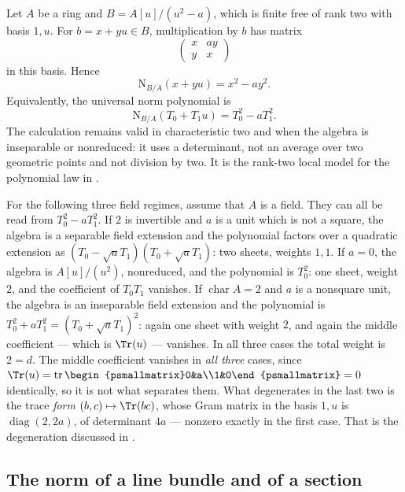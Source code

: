 \begin{example}
\label{ex:ch41-rank-two}
Let $A$ be a ring and
$B=A[u]/(u^2-a)$, which is finite free of rank two with basis $1,u$.
For $b=x+yu\in B$, multiplication by $b$ has matrix
\[
             \begin{pmatrix}x&ay\\ y&x\end{pmatrix}
\]
in this basis.  Hence
\[
             \mathrm N_{B/A}(x+yu)=x^2-ay^2.
\]
Equivalently, the universal norm polynomial is
\[
             \mathrm N_{B/A}(T_0+T_1u)=T_0^2-aT_1^2.
\]
The calculation remains valid in characteristic two and when the algebra
is inseparable or nonreduced: it uses a determinant, not an average over two
geometric points and not division by two.  It is the rank-two local model
for the polynomial law in .

For the following three field regimes, assume that $A$ is a field.
They can all be read from $T_0^2-aT_1^2$.  If $2$ is invertible and $a$ is a unit which is not a
square, the algebra is a separable field extension and the polynomial
factors over a quadratic extension as
$(T_0-\sqrt aT_1)(T_0+\sqrt aT_1)$: two sheets, weights $1,1$.  If
$a=0$, the algebra is $A[u]/(u^2)$, nonreduced, and the polynomial is
$T_0^2$: one sheet, weight $2$, and the coefficient of $T_0T_1$
vanishes.  If $\operatorname{char}A=2$ and $a$ is a nonsquare unit, the
algebra is an inseparable field extension and the polynomial is
$T_0^2+aT_1^2=(T_0+\sqrt aT_1)^2$: again one sheet with weight $2$, and
again the middle coefficient --- which is $\Tr(u)$ --- vanishes.
In all three cases the total weight is $2=d$.  The middle coefficient
vanishes in \emph{all three} cases, since
$\Tr(u)=\operatorname{tr}\begin{psmallmatrix}0&a\\1&0\end{psmallmatrix}=0$
identically, so it is not what separates them.  What degenerates in the last
two is the trace \emph{form} $(b,c)\mapsto\Tr(bc)$, whose Gram matrix in
the basis $1,u$ is $\operatorname{diag}(2,2a)$, of determinant $4a$ ---
nonzero exactly in the first case.  That is the degeneration discussed in
.
\end{example}

\subsection{The norm of a line bundle and of a section}
\label{sec:ch41-norm-line}

